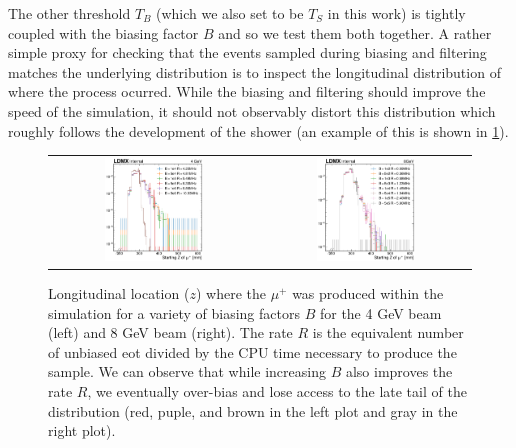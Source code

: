 The other threshold $T_B$ (which we also set to be $T_S$ in this work) is tightly coupled
with the biasing factor $B$ and so we test them both together.
A rather simple proxy for checking that the events sampled during biasing and filtering
matches the underlying distribution is to inspect the longitudinal distribution of where
the process ocurred.
While the biasing and filtering should improve the speed of the simulation,
it should not observably distort this distribution which roughly follows the development of
the shower (an example of this is shown in \cref{fig:dimuon-z}).

\begin{figure}
  \centering
  \begin{tabular}{cc}
    \includegraphics[width=0.49\textwidth]{figures/ldmx/simulation/dimuon-z-4gev.pdf}
    &
    \includegraphics[width=0.49\textwidth]{figures/ldmx/simulation/dimuon-z-8gev.pdf}
  \end{tabular}
  \caption{
    Longitudinal location ($z$) where the $\mu^+$ was produced within the simulation
    for a variety of biasing factors $B$ for the 4 GeV beam (left) and 8 GeV beam (right).
    The rate $R$ is the equivalent number of unbiased \ac{eot} divided by the CPU time
    necessary to produce the sample.
    We can observe that while increasing $B$ also improves the rate $R$,
    we eventually over-bias and lose access to the late tail of the distribution
    (red, puple, and brown in the left plot and gray in the right plot).
  }
  \label{fig:dimuon-z}
\end{figure}

